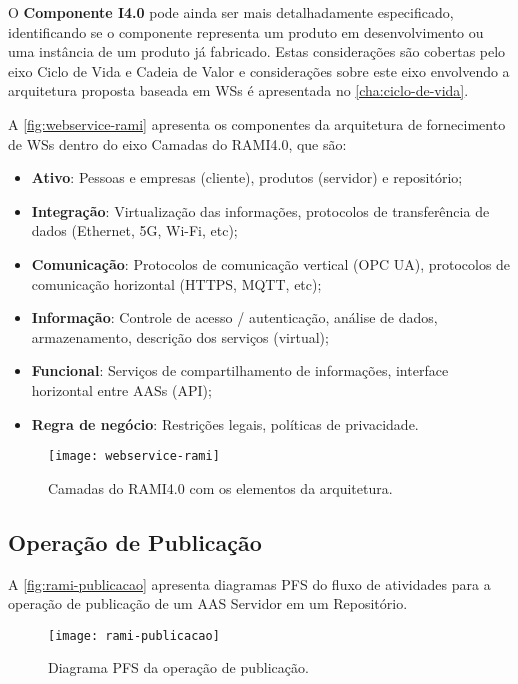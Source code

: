 	O \textbf{Componente I4.0} pode ainda ser mais detalhadamente especificado, identificando se o componente representa um produto em desenvolvimento ou uma instância de um produto já fabricado. Estas considerações são cobertas pelo eixo Ciclo de Vida e Cadeia de Valor e considerações sobre este eixo envolvendo a arquitetura proposta baseada em WSs é apresentada no \autoref{cha:ciclo-de-vida}.
	
	A \autoref{fig:webservice-rami} apresenta os componentes da arquitetura de fornecimento de WSs dentro do eixo Camadas do RAMI4.0, que são:
	
	\begin{itemize}
		\item \textbf{Ativo}: Pessoas e empresas (cliente), produtos (servidor) e repositório; 
		\item \textbf{Integração}: Virtualização das informações, protocolos de transferência de dados (Ethernet, 5G, Wi-Fi, etc); 
		\item \textbf{Comunicação}: Protocolos de comunicação vertical (OPC UA), protocolos de comunicação horizontal (HTTPS, MQTT, etc); 
		\item \textbf{Informação}: Controle de acesso / autenticação, análise de dados, armazenamento, descrição dos serviços (virtual);
		\item \textbf{Funcional}: Serviços de compartilhamento de informações, interface horizontal entre AASs (API); 
		\item \textbf{Regra de negócio}: Restrições legais, políticas de privacidade.
	\end{itemize}
	
	\begin{figure}[H]
		\centering
		\caption{Camadas do RAMI4.0 com os elementos da arquitetura.}
		\label{fig:webservice-rami}
		\texttt{[image: webservice-rami]}
	\end{figure}

\subsection{Operação de Publicação}

	A \autoref{fig:rami-publicacao} apresenta diagramas PFS do fluxo de atividades para a operação de publicação de um AAS Servidor em um Repositório.
	
	\begin{figure}[htb]
		\centering
		\caption{Diagrama PFS da operação de publicação.}
		\label{fig:rami-publicacao}
		\texttt{[image: rami-publicacao]}
	\end{figure}

